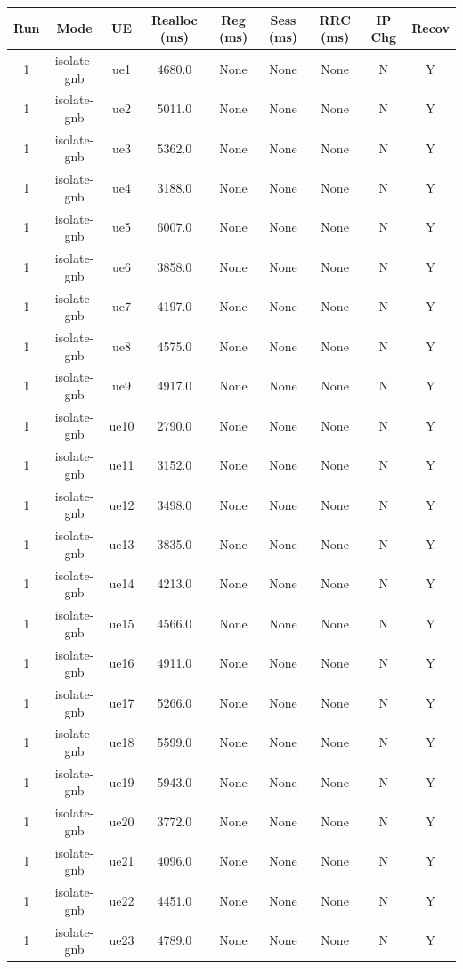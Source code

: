 \begin{table}[ht]
\centering
\begin{tabular}{|c|c|c|c|c|c|c|c|c|}
\hline
Run & Mode & UE & Realloc (ms) & Reg (ms) & Sess (ms) & RRC (ms) & IP Chg & Recov \\
\hline
1 & isolate-gnb & ue1 & 4680.0 & None & None & None & N & Y \\
1 & isolate-gnb & ue2 & 5011.0 & None & None & None & N & Y \\
1 & isolate-gnb & ue3 & 5362.0 & None & None & None & N & Y \\
1 & isolate-gnb & ue4 & 3188.0 & None & None & None & N & Y \\
1 & isolate-gnb & ue5 & 6007.0 & None & None & None & N & Y \\
1 & isolate-gnb & ue6 & 3858.0 & None & None & None & N & Y \\
1 & isolate-gnb & ue7 & 4197.0 & None & None & None & N & Y \\
1 & isolate-gnb & ue8 & 4575.0 & None & None & None & N & Y \\
1 & isolate-gnb & ue9 & 4917.0 & None & None & None & N & Y \\
1 & isolate-gnb & ue10 & 2790.0 & None & None & None & N & Y \\
1 & isolate-gnb & ue11 & 3152.0 & None & None & None & N & Y \\
1 & isolate-gnb & ue12 & 3498.0 & None & None & None & N & Y \\
1 & isolate-gnb & ue13 & 3835.0 & None & None & None & N & Y \\
1 & isolate-gnb & ue14 & 4213.0 & None & None & None & N & Y \\
1 & isolate-gnb & ue15 & 4566.0 & None & None & None & N & Y \\
1 & isolate-gnb & ue16 & 4911.0 & None & None & None & N & Y \\
1 & isolate-gnb & ue17 & 5266.0 & None & None & None & N & Y \\
1 & isolate-gnb & ue18 & 5599.0 & None & None & None & N & Y \\
1 & isolate-gnb & ue19 & 5943.0 & None & None & None & N & Y \\
1 & isolate-gnb & ue20 & 3772.0 & None & None & None & N & Y \\
1 & isolate-gnb & ue21 & 4096.0 & None & None & None & N & Y \\
1 & isolate-gnb & ue22 & 4451.0 & None & None & None & N & Y \\
1 & isolate-gnb & ue23 & 4789.0 & None & None & None & N & Y \\

\end{tabular}
\end{table}
